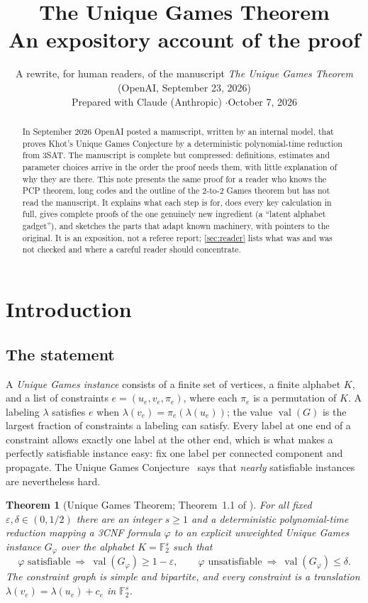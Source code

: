 \documentclass[11pt]{article}
\title{\textbf{The Unique Games Theorem}\\[4pt]
\large An expository account of the proof}
\author{A rewrite, for human readers, of the manuscript \emph{The Unique Games Theorem}\\
(OpenAI, September 23, 2026)\\[6pt]
\small Prepared with Claude (Anthropic) \quad$\cdot$\quad October 7, 2026}
\date{}
\newtheorem{theorem}{Theorem}[section]
\theoremstyle{definition}
\theoremstyle{remark}
\newcommand{\F}{\mathbb F}
\newcommand{\eps}{\varepsilon}
\DeclareMathOperator{\val}{val}
\begin{document}
\maketitle

\begin{abstract}
\noindent
In September 2026 OpenAI posted a manuscript, written by an internal model, that
proves Khot's Unique Games Conjecture by a deterministic polynomial-time
reduction from 3SAT. The manuscript is complete but compressed: definitions,
estimates and parameter choices arrive in the order the proof needs them, with
little explanation of why they are there. This note presents the same proof for
a reader who knows the PCP theorem, long codes and the outline of the 2-to-2
Games theorem but has not read the manuscript. It explains what each step is
for, does every key calculation in full, gives complete proofs of the one
genuinely new ingredient (a ``latent alphabet gadget''), and sketches the parts
that adapt known machinery, with pointers to the original. It is an exposition,
not a referee report; \cref{sec:reader} lists what was and was not checked and
where a careful reader should concentrate.
\end{abstract}

{\small\setlength{\parskip}{0pt}\tableofcontents}
\clearpage

\section{Introduction}\label{sec:intro}

\subsection{The statement}

A \emph{Unique Games instance} consists of a finite set of vertices, a finite
alphabet $K$, and a list of constraints $e=(u_e,v_e,\pi_e)$, where each
$\pi_e$ is a permutation of $K$. A labeling $\lambda$ satisfies $e$ when
$\lambda(v_e)=\pi_e(\lambda(u_e))$; the value $\val(G)$ is the largest
fraction of constraints a labeling can satisfy. Every label at one end of a
constraint allows exactly one label at the other end, which is what makes a
perfectly satisfiable instance easy: fix one label per connected component and
propagate. The Unique Games Conjecture~\cite{Khot02} says that \emph{nearly}
satisfiable instances are nevertheless hard.

\begin{theorem}[Unique Games Theorem; Theorem~1.1 of \cite{OpenAI-UGC}]\label{thm:ugc}
For all fixed $\eps,\delta\in(0,1/2)$ there are an integer $s\ge1$ and a
deterministic polynomial-time reduction mapping a 3CNF formula $\varphi$ to an
explicit unweighted Unique Games instance $G_\varphi$ over the alphabet
$K=\F_2^s$ such that
\[
\varphi\text{ satisfiable}\ \Rightarrow\ \val(G_\varphi)\ge1-\eps,
\qquad
\varphi\text{ unsatisfiable}\ \Rightarrow\ \val(G_\varphi)\le\delta.
\]
The constraint graph is simple and bipartite, and every constraint is a
translation $\lambda(v_e)=\lambda(u_e)+c_e$ in $\F_2^s$.
\end{theorem}
\end{document}
